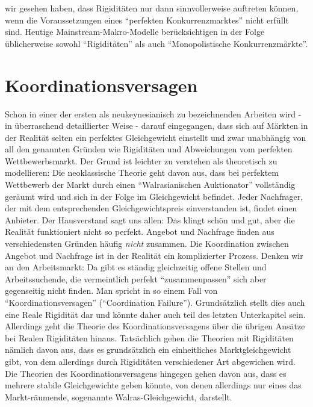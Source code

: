 wir gesehen haben, dass Rigiditäten nur dann sinnvollerweise auftreten können, wenn die Voraussetzungen eines "`perfekten Konkurrenzmarktes"' nicht erfüllt sind. Heutige Mainstream-Makro-Modelle berücksichtigen in der Folge üblicherweise sowohl "`Rigiditäten"' als auch "`Monopolistische Konkurrenzmärkte"'.


\section{Koordinationsversagen}
\label{Suchtheorie}
Schon in einer der ersten als neukeynesianisch zu bezeichnenden Arbeiten wird - in überraschend detaillierter Weise - darauf eingegangen, dass sich auf Märkten in der Realität selten ein perfektes Gleichgewicht einstellt \parencite[S. 683]{Phelps1968} und zwar unabhängig von all den genannten Gründen wie Rigiditäten und Abweichungen vom perfekten Wettbewerbsmarkt. Der Grund ist leichter zu verstehen als theoretisch zu modellieren: Die neoklassische Theorie geht davon aus, dass bei perfektem Wettbewerb der Markt durch einen "`Walrasianischen Auktionator"' vollständig geräumt wird und sich in der Folge im Gleichgewicht befindet. Jeder Nachfrager, der mit dem entsprechenden Gleichgewichtspreis einverstanden ist, findet einen Anbieter. Der Hausverstand sagt uns allen: Das klingt schön und gut, aber die Realität funktioniert nicht so perfekt. Angebot und Nachfrage finden aus verschiedensten Gründen häufig \textit{nicht} zusammen. Die Koordination zwischen Angebot und Nachfrage ist in der Realität ein komplizierter Prozess. Denken wir an den Arbeitsmarkt: Da gibt es ständig gleichzeitig offene Stellen und Arbeitssuchende, die vermeintlich perfekt "`zusammenpassen"' sich aber gegenseitig nicht finden. Man spricht in so einem Fall von "`Koordinationsversagen"' ("`Coordination Failure"').
Grundsätzlich stellt dies auch eine Reale Rigidität dar \parencite[S. 11]{RomerDavid1993} und könnte daher auch teil des letzten Unterkapitel sein. Allerdings geht die Theorie des Koordinationsversagens über die übrigen Ansätze bei Realen Rigiditäten hinaus. Tatsächlich gehen die Theorien mit Rigiditäten nämlich davon aus, dass es grundsätzlich ein einheitliches Marktgleichgewicht gibt, von dem allerdings durch Rigiditäten verschiedener Art abgewichen wird. Die Theorien des Koordinationsversagens hingegen gehen davon aus, dass es mehrere stabile Gleichgewichte geben könnte, von denen allerdings nur eines das Markt-räumende, sogenannte Walras-Gleichgewicht, darstellt. 
